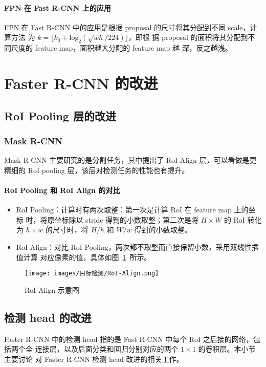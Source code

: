 \paragraph{FPN 在 Fast R-CNN 上的应用}

FPN 在 Fast R-CNN 中的应用是根据 proposal 的尺寸将其分配到不同 scale，计算方法
为 $ k = \lfloor k_0 + \mathrm{log}_2 ( \sqrt{wh}/224 ) \rfloor$，即根
据 proposal 的面积将其分配到不同尺度的 feature map，面积越大分配的 feature map 越
深，反之越浅。

\section{Faster R-CNN 的改进}
\label{sec:faster-improve}

\subsection{RoI Pooling 层的改进}
\subsubsection{Mask R-CNN}
Mask R-CNN 主要研究的是分割任务，其中提出了 RoI Align 层，可以看做是更精细的 RoI
pooling 层，该层对检测任务的性能也有提升。

\paragraph{RoI Pooling 和 RoI Align 的对比}

\begin{itemize}
  \item RoI Pooling：计算时有两次取整：第一次是计算 RoI 在 feature map 上的坐标
    时，将原坐标除以 stride 得到的小数取整；第二次是将 $H \times W$ 的 RoI 转化为 $h
    \times w$ 的尺寸时，将 $H/h$ 和 $W/w$ 得到的小数取整。
  \item RoI Align：对比 RoI Pooling，两次都不取整而直接保留小数，采用双线性插值计算
    对应像素的值，具体如图~\ref{fig:roi-align}~所示。
\end{itemize}

\begin{figure}[ht]
  \centering
  \texttt{[image: images/目标检测/RoI-Align.png]}
  \caption{RoI Align 示意图}
  \label{fig:roi-align}
\end{figure}

\subsection{检测 head 的改进}
Faster R-CNN 中的检测 head 指的是 Fast R-CNN 中每个 RoI 之后接的网络，包括两个全
连接层，以及后面分类和回归分别对应的两个 $1 \times 1$ 的卷积层。本小节主要讨论
对 Faster R-CNN 检测 head 改进的相关工作。

